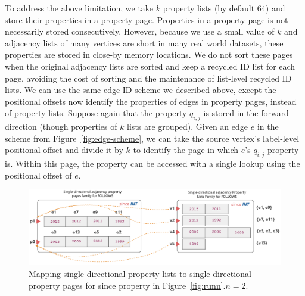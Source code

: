  To address the above limitation, we take $k$ property lists (by default 64) and store their properties in a property page. Properties in a property page is not necessarily stored consecutively. However, because we use a small value of $k$ and adjacency lists of many vertices are short in many real world datasets, these properties are stored in close-by memory locations. We do not sort these pages when the original adjacency lists are sorted and keep a recycled ID list for each page, avoiding the cost of sorting and the maintenance of list-level recycled ID lists. We can use the same edge ID scheme we described above, except the positional offsets now identify the properties of edges in property pages, instead of property lists. Suppose again that the property $q_{i, j}$ is stored in the forward direction (though properties of $k$ lists are grouped). Given an edge $e$ in the scheme from Figure~\ref{fig:edge-scheme}, we can take the source vertex's label-level positional offset and divide it by $k$ to identify the page in which $e$'s $q_{i, j}$ property is. Within this page, the property can be accessed with a single lookup using the positional offset of $e$.

\begin{figure}
	\hfill\includegraphics[scale=0.78]{img/paged}\hspace*{\fill}
	\captionsetup{justification=centering}
	\caption{Mapping single-directional property lists to single-directional property pages for since property in Figure~\ref{fig:runn}.$n=2$.}
	\label{fig:paged}
\end{figure}


